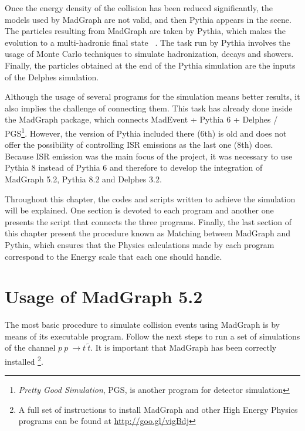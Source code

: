 \documentclass[12pt, oneside]{book}              %
\begin{document}
Once the energy density of the collision has been reduced significantly, the models used
by MadGraph are not valid, and then Pythia appears in the scene. The particles resulting
from MadGraph are taken by Pythia, which makes the evolution to a multi-hadronic final
state ~\cite{Sjostrand:2014zea}. The task run by Pythia involves the usage of Monte
Carlo techniques to simulate hadronization, decays and showers. Finally, the particles
obtained at the end of the Pythia simulation are the inputs of the Delphes simulation.

Although the usage of several programs for the simulation means better results, it also
implies the challenge of connecting them. This task has already done inside the MadGraph
package, which connects MadEvent + Pythia 6 + Delphes / PGS\footnote{\textit{Pretty 
Good Simulation}, PGS, is another program for detector simulation}. However, the version
of Pythia included there (6th) is old and does not offer the possibility of controlling 
ISR emissions as the last one (8th) does. Because ISR emission was the main focus of the 
project, it was necessary to use Pythia 8 instead of Pythia 6 and therefore to develop
the integration of MadGraph 5.2, Pythia 8.2 and Delphes 3.2.

Throughout this chapter, the codes and scripts written to achieve the simulation will
be explained. One section is devoted to each program and another one presents the
script that connects the three programs. Finally, the last section of this chapter
present the procedure known as Matching between MadGraph and Pythia, which ensures that
the Physics calculations made by each program correspond to the Energy scale that
each one should handle.

\section{Usage of MadGraph 5.2} \label{sec:MadGraph}

The most basic procedure to simulate collision events using MadGraph is by means of its
executable program. Follow the next steps to run a set of simulations of the channel
$ p\ p\ \to t\ \tilde{t} $. It is important that MadGraph has been correctly installed
\footnote{A full set of instructions to install MadGraph and other High Energy Physics
programs can be found at \url{http://goo.gl/vigBdj}}.
\end{document}
